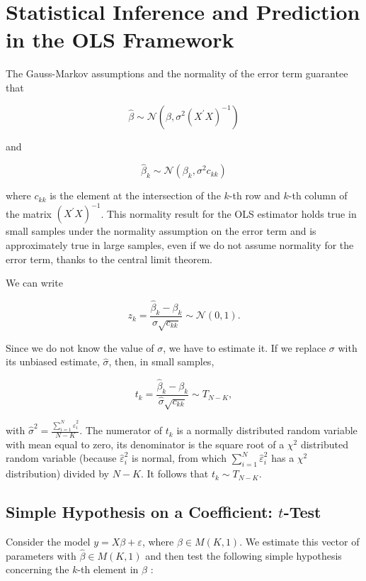 \section{Statistical Inference and Prediction in the OLS Framework}
The Gauss-Markov assumptions and the normality of the error term guarantee that

$$
\widehat{\beta} \sim \mathcal{N}\left(\beta, \sigma^{2}\left(X^{\prime} X\right)^{-1}\right)
$$

and

$$
\widehat{\beta}_{k} \sim \mathcal{N}\left(\beta_{k}, \sigma^{2} c_{k k}\right)
$$

where $c_{k k}$ is the element at the intersection of the $k$-th row and $k$-th column of the matrix $\left(X^{\prime} X\right)^{-1}$. This normality result for the OLS estimator holds true in small samples under the normality assumption on the error term and is approximately true in large samples, even if we do not assume normality for the error term, thanks to the central limit theorem.

We can write

$$
z_{k}=\frac{\widehat{\beta}_{k}-\beta_{k}}{\sigma \sqrt{c_{k k}}} \sim \mathcal{N}(0,1) .
$$

Since we do not know the value of $\sigma$, we have to estimate it. If we replace $\sigma$ with its unbiased estimate, $\widehat{\sigma}$, then, in small samples,

$$
t_{k}=\frac{\widehat{\beta}_{k}-\beta_{k}}{\widehat{\sigma} \sqrt{c_{k k}}} \sim T_{N-K},
$$

with $\widehat{\sigma}^{2}=\frac{\sum_{i=1}^{N} \widehat{\varepsilon}_{i}^{2}}{N-K}$. The numerator of $t_{k}$ is a normally distributed random variable with mean equal to zero, its denominator is the square root of a $\chi^{2}$ distributed random variable (because $\widehat{\varepsilon}_{i}^{2}$ is normal, from which $\sum_{i=1}^{N} \widehat{\varepsilon}_{i}^{2}$ has a $\chi^{2}$ distribution) divided by $N-K$. It follows that $t_{k} \sim T_{N-K}$.

\subsection{Simple Hypothesis on a Coefficient: $t$-Test}
Consider the model $y=X \beta+\varepsilon$, where $\beta \in M(K, 1)$. We estimate this vector of parameters with $\widehat{\beta} \in M(K, 1)$ and then test the following simple hypothesis concerning the $k$-th element in $\beta$ :

